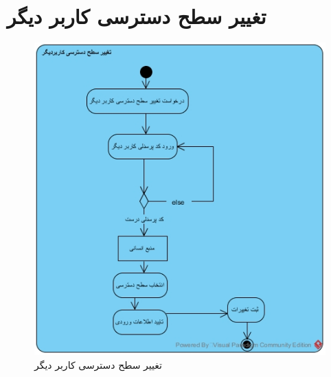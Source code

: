 \section{تغییر سطح دسترسی کاربر دیگر}
\begin{figure}[H]
	\centering
	\includegraphics[scale=0.8]{img/activity/changeacc}
	\caption{تغییر سطح دسترسی کاربر دیگر}
\end{figure}


